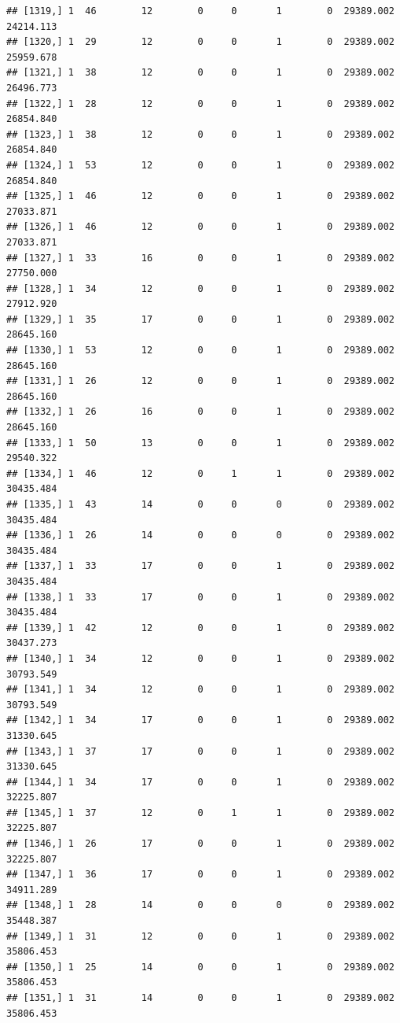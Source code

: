 \documentclass[
]{article}
\begin{document}
\begin{verbatim}
## [1319,] 1  46        12        0     0       1        0  29389.002  24214.113
## [1320,] 1  29        12        0     0       1        0  29389.002  25959.678
## [1321,] 1  38        12        0     0       1        0  29389.002  26496.773
## [1322,] 1  28        12        0     0       1        0  29389.002  26854.840
## [1323,] 1  38        12        0     0       1        0  29389.002  26854.840
## [1324,] 1  53        12        0     0       1        0  29389.002  26854.840
## [1325,] 1  46        12        0     0       1        0  29389.002  27033.871
## [1326,] 1  46        12        0     0       1        0  29389.002  27033.871
## [1327,] 1  33        16        0     0       1        0  29389.002  27750.000
## [1328,] 1  34        12        0     0       1        0  29389.002  27912.920
## [1329,] 1  35        17        0     0       1        0  29389.002  28645.160
## [1330,] 1  53        12        0     0       1        0  29389.002  28645.160
## [1331,] 1  26        12        0     0       1        0  29389.002  28645.160
## [1332,] 1  26        16        0     0       1        0  29389.002  28645.160
## [1333,] 1  50        13        0     0       1        0  29389.002  29540.322
## [1334,] 1  46        12        0     1       1        0  29389.002  30435.484
## [1335,] 1  43        14        0     0       0        0  29389.002  30435.484
## [1336,] 1  26        14        0     0       0        0  29389.002  30435.484
## [1337,] 1  33        17        0     0       1        0  29389.002  30435.484
## [1338,] 1  33        17        0     0       1        0  29389.002  30435.484
## [1339,] 1  42        12        0     0       1        0  29389.002  30437.273
## [1340,] 1  34        12        0     0       1        0  29389.002  30793.549
## [1341,] 1  34        12        0     0       1        0  29389.002  30793.549
## [1342,] 1  34        17        0     0       1        0  29389.002  31330.645
## [1343,] 1  37        17        0     0       1        0  29389.002  31330.645
## [1344,] 1  34        17        0     0       1        0  29389.002  32225.807
## [1345,] 1  37        12        0     1       1        0  29389.002  32225.807
## [1346,] 1  26        17        0     0       1        0  29389.002  32225.807
## [1347,] 1  36        17        0     0       1        0  29389.002  34911.289
## [1348,] 1  28        14        0     0       0        0  29389.002  35448.387
## [1349,] 1  31        12        0     0       1        0  29389.002  35806.453
## [1350,] 1  25        14        0     0       1        0  29389.002  35806.453
## [1351,] 1  31        14        0     0       1        0  29389.002  35806.453

\end{verbatim}
\end{document}
